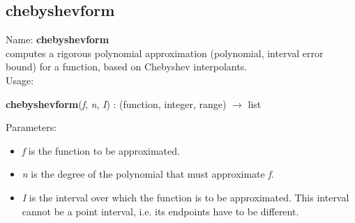 \subsection{chebyshevform}
\label{labchebyshevform}
\noindent Name: \textbf{chebyshevform}\\
\phantom{aaa}computes a rigorous polynomial approximation (polynomial, interval error bound) for a function, based on Chebyshev interpolants.\\[0.2cm]
\noindent Usage: 
\begin{center}
\textbf{chebyshevform}(\emph{f}, \emph{n}, \emph{I}) : (\textsf{function}, \textsf{integer}, \textsf{range}) $\rightarrow$ \textsf{list}\\
\end{center}
Parameters: 
\begin{itemize}
\item \emph{f} is the function to be approximated.
\item \emph{n} is the degree of the polynomial that must approximate \emph{f}.
\item \emph{I} is the interval over which the function is to be approximated. This interval cannot be a point interval, i.e. its endpoints have to be different.
\end{itemize}

